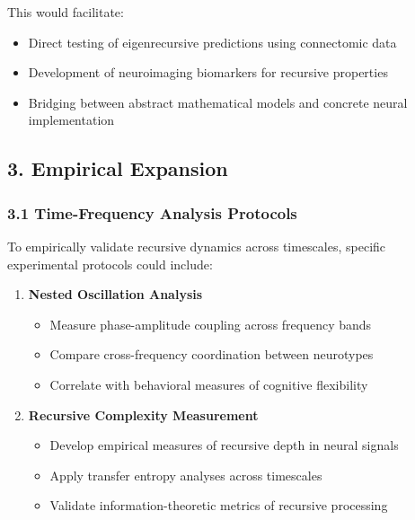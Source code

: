 \documentclass[
]{article}
\providecommand{\tightlist}{%
  \setlength{\itemsep}{0pt}\setlength{\parskip}{0pt}}
\begin{document}
This would facilitate:

\begin{itemize}
\tightlist
\item
  Direct testing of eigenrecursive predictions using connectomic data
\item
  Development of neuroimaging biomarkers for recursive properties
\item
  Bridging between abstract mathematical models and concrete neural
  implementation
\end{itemize}

\subsection{3. Empirical Expansion}\label{empirical-expansion}

\subsubsection{3.1 Time-Frequency Analysis
Protocols}\label{time-frequency-analysis-protocols}

To empirically validate recursive dynamics across timescales, specific
experimental protocols could include:

\begin{enumerate}
\def\labelenumi{\arabic{enumi}.}
\tightlist
\item
  \textbf{Nested Oscillation Analysis}

  \begin{itemize}
  \tightlist
  \item
    Measure phase-amplitude coupling across frequency bands
  \item
    Compare cross-frequency coordination between neurotypes
  \item
    Correlate with behavioral measures of cognitive flexibility
  \end{itemize}
\item
  \textbf{Recursive Complexity Measurement}

  \begin{itemize}
  \tightlist
  \item
    Develop empirical measures of recursive depth in neural signals
  \item
    Apply transfer entropy analyses across timescales
  \item
    Validate information-theoretic metrics of recursive processing
  \end{itemize}
\end{enumerate}
\end{document}
